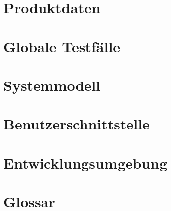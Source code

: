 \documentclass[parskip=full]{scrartcl}
\begin{document}
\section{Produktdaten}


\section{Globale Testf\"alle}


\section{Systemmodell}


\section{Benutzerschnittstelle}


\section{Entwicklungsumgebung}


\section{Glossar}
\printglossaries
\end{document}
